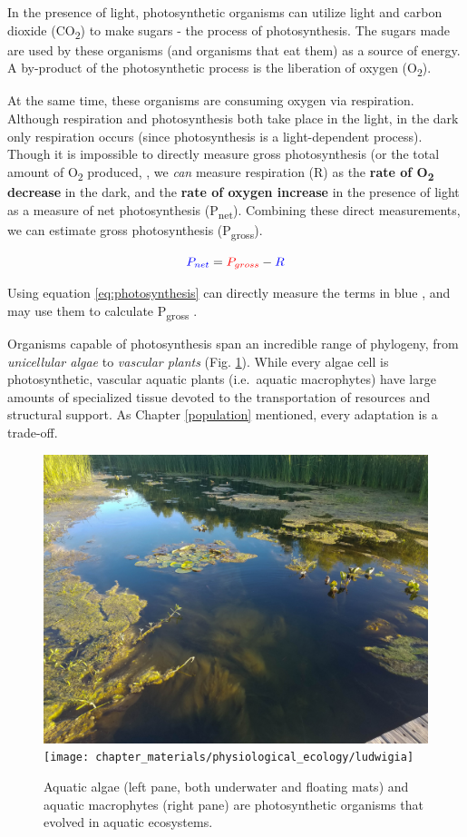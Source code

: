 \documentclass[]{krantz}
\theoremstyle{definition}
\theoremstyle{definition}
\theoremstyle{definition}
\theoremstyle{remark}
\begin{document}
\newcommand{\textunderscript}[1]{$_{\text{#1}}$}

In the presence of light, photosynthetic organisms can utilize light and
carbon dioxide (CO\textsubscript{2}) to make sugars - the process of
photosynthesis. The sugars made are used by these organisms (and
organisms that eat them) as a source of energy. A by-product of the
photosynthetic process is the liberation of oxygen (O\textsubscript{2}).

At the same time, these organisms are consuming oxygen via respiration.
Although respiration and photosynthesis both take place in the light, in
the dark only respiration occurs (since photosynthesis is a
light-dependent process). Though it is impossible to directly measure
gross photosynthesis (or the total amount of O\textsubscript{2}
produced, \citep{wohlfahrt_many_2015}, we \emph{can} measure respiration
(R) as the \textbf{rate of O\textsubscript{2} decrease} in the dark, and
the \textbf{rate of oxygen increase} in the presence of light as a
measure of net photosynthesis (P\textsubscript{net}). Combining these
direct measurements, we can estimate gross photosynthesis
(P\textsubscript{gross}).

\begin{equation}
\color{blue} P_{net} \color{black}= \color{red}P_{gross} \color{black}- \color{blue}R
\label{eq:photosynthesis}
\end{equation}

Using equation \eqref{eq:photosynthesis} can directly measure the terms in
\color{blue} blue \color{black}, and may use them to calculate
\color{red} P\textsubscript{gross} \color{black}.

Organisms capable of photosynthesis span an incredible range of
phylogeny, from \emph{unicellular algae} to \emph{vascular plants} (Fig.
\ref{fig:organisms}). While every algae cell is photosynthetic, vascular
aquatic plants (i.e.~aquatic macrophytes) have large amounts of
specialized tissue devoted to the transportation of resources and
structural support. As Chapter \ref{population} mentioned, every
adaptation is a trade-off.

\begin{figure}
\includegraphics[width=0.5\linewidth]{chapter_materials/physiological_ecology/aquatic_photosynthesis} \texttt{[image: chapter\_materials/physiological\_ecology/ludwigia]} \caption{Aquatic algae (left pane, both underwater and floating mats) and aquatic macrophytes (right pane) are photosynthetic organisms that evolved in aquatic ecosystems.}\label{fig:organisms}
\end{figure}
\end{document}
